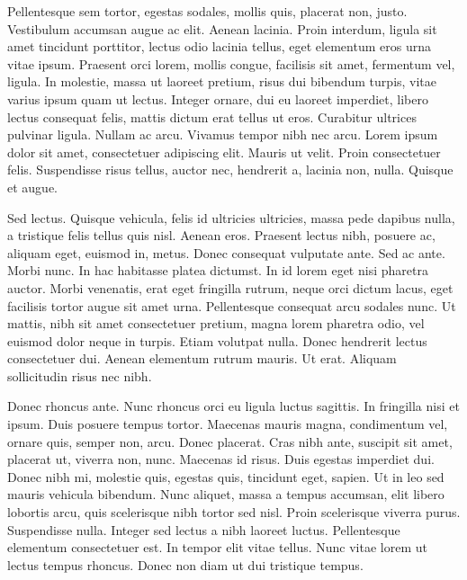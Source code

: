 Pellentesque sem tortor, egestas sodales, mollis quis, placerat non, justo. Vestibulum accumsan augue ac elit. Aenean lacinia. Proin interdum, ligula sit amet tincidunt porttitor, lectus odio lacinia tellus, eget elementum eros urna vitae ipsum. Praesent orci lorem, mollis congue, facilisis sit amet, fermentum vel, ligula. In molestie, massa ut laoreet pretium, risus dui bibendum turpis, vitae varius ipsum quam ut lectus. Integer ornare, dui eu laoreet imperdiet, libero lectus consequat felis, mattis dictum erat tellus ut eros. Curabitur ultrices pulvinar ligula. Nullam ac arcu. Vivamus tempor nibh nec arcu. Lorem ipsum dolor sit amet, consectetuer adipiscing elit. Mauris ut velit. Proin consectetuer felis. Suspendisse risus tellus, auctor nec, hendrerit a, lacinia non, nulla. Quisque et augue.

Sed lectus. Quisque vehicula, felis id ultricies ultricies, massa pede dapibus nulla, a tristique felis tellus quis nisl. Aenean eros. Praesent lectus nibh, posuere ac, aliquam eget, euismod in, metus. Donec consequat vulputate ante. Sed ac ante. Morbi nunc. In hac habitasse platea dictumst. In id lorem eget nisi pharetra auctor. Morbi venenatis, erat eget fringilla rutrum, neque orci dictum lacus, eget facilisis tortor augue sit amet urna. Pellentesque consequat arcu sodales nunc. Ut mattis, nibh sit amet consectetuer pretium, magna lorem pharetra odio, vel euismod dolor neque in turpis. Etiam volutpat nulla. Donec hendrerit lectus consectetuer dui. Aenean elementum rutrum mauris. Ut erat. Aliquam sollicitudin risus nec nibh.

Donec rhoncus ante. Nunc rhoncus orci eu ligula luctus sagittis. In fringilla nisi et ipsum. Duis posuere tempus tortor. Maecenas mauris magna, condimentum vel, ornare quis, semper non, arcu. Donec placerat. Cras nibh ante, suscipit sit amet, placerat ut, viverra non, nunc. Maecenas id risus. Duis egestas imperdiet dui. Donec nibh mi, molestie quis, egestas quis, tincidunt eget, sapien. Ut in leo sed mauris vehicula bibendum. Nunc aliquet, massa a tempus accumsan, elit libero lobortis arcu, quis scelerisque nibh tortor sed nisl. Proin scelerisque viverra purus. Suspendisse nulla. Integer sed lectus a nibh laoreet luctus. Pellentesque elementum consectetuer est. In tempor elit vitae tellus. Nunc vitae lorem ut lectus tempus rhoncus. Donec non diam ut dui tristique tempus.